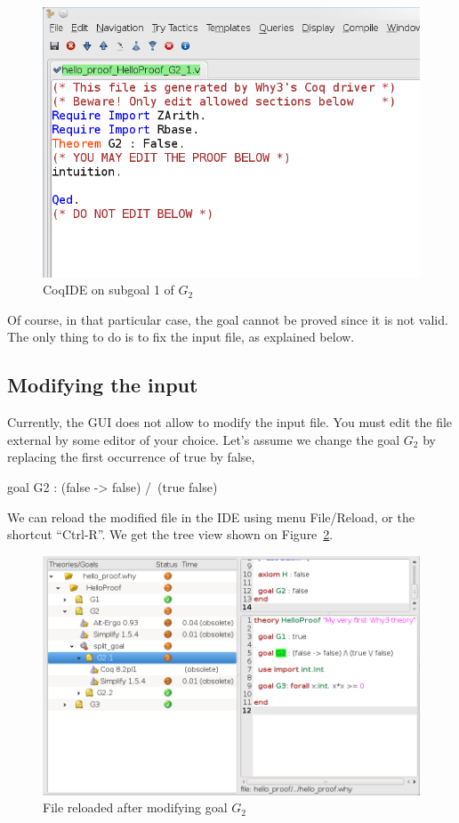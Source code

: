 \begin{figure}[tbp]
  \includegraphics[width=\textwidth]{coqide-0-70.png}
  \caption{CoqIDE on subgoal 1 of $G_2$}
  \label{fig:coqide}
\end{figure}

Of course, in that particular case, the goal cannot be proved since it
is not valid. The only thing to do is to fix the input file, as
explained below.

\subsection{Modifying the input}

Currently, the GUI does not allow to modify the input file. You must
edit the file external by some editor of your choice. Let's assume we
change the goal $G_2$ by replacing the first occurrence of true by
false, \eg
\begin{why3}
  goal G2 : (false -> false) /\ (true \/ false)
\end{why3}
We can reload the modified file in the IDE using menu \textsf{File/Reload}, or the shortcut ``Ctrl-R''. We get the tree view shown on Figure~\ref{fig:gui5}.

\begin{figure}[tbp]
  \includegraphics[width=\textwidth]{gui-0-70-5.png}
  \caption{File reloaded after modifying goal $G_2$}
  \label{fig:gui5}
\end{figure}


